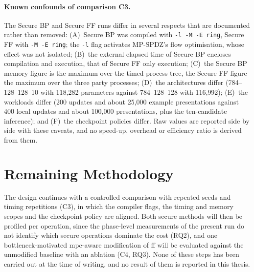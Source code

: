 \paragraph{Known confounds of comparison C3.} The Secure BP and Secure FF runs differ in several respects that are documented rather than removed: (A)~Secure BP was compiled with \texttt{-l -M -E ring}, Secure FF with \texttt{-M -E ring}; the \texttt{-l} flag activates MP-SPDZ's flow optimisation, whose effect was not isolated; (B)~the external elapsed time of Secure BP encloses compilation and execution, that of Secure FF only execution; (C)~the Secure BP memory figure is the maximum over the timed process tree, the Secure FF figure the maximum over the three party processes; (D)~the architectures differ (784--128--128--10 with 118{,}282 parameters against 784--128--128 with 116{,}992); (E)~the workloads differ (200 updates and about 25{,}000 example presentations against 400 local updates and about 100{,}000 presentations, plus the ten-candidate inference); and (F)~the checkpoint policies differ. Raw values are reported side by side with these caveats, and no speed-up, overhead or efficiency ratio is derived from them.

\section{Remaining Methodology}\label{sec:method-planned}
The design continues with a controlled comparison with repeated seeds and timing repetitions (C3), in which the compiler flags, the timing and memory scopes and the checkpoint policy are aligned. Both secure methods will then be profiled per operation, since the phase-level measurements of the present run do not identify which secure operations dominate the cost (RQ2), and one bottleneck-motivated \ac{mpc}-aware modification of \ac{ff} will be evaluated against the unmodified baseline with an ablation (C4, RQ3). None of these steps has been carried out at the time of writing, and no result of them is reported in this thesis.
